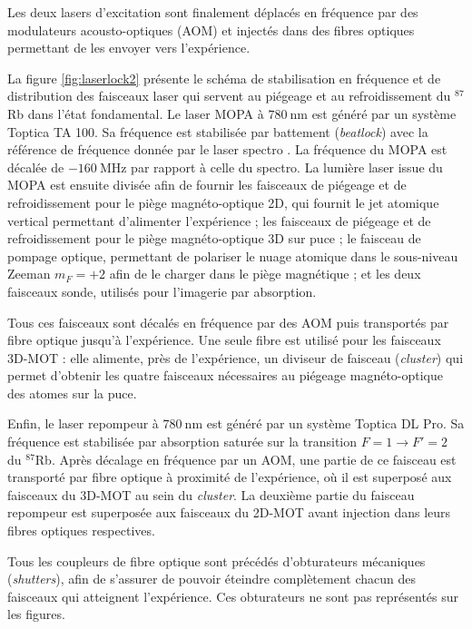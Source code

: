 \documentclass[11pt,a4paper,twoside]{book}
\newcommand{\Rb}[1]{${}^{#1}$Rb}
\begin{document}
Les deux lasers d'excitation sont finalement déplacés en fréquence par des modulateurs acousto-optiques (AOM) et injectés dans des fibres optiques permettant de les envoyer vers l'expérience.

La figure \eqref{fig:laserlock2} présente le schéma de stabilisation en fréquence et de distribution des faisceaux laser qui servent au piégeage et au refroidissement du \Rb{87} dans l'état fondamental.
Le laser \og MOPA \fg{} à $\SI{780}{\nano\meter}$ est généré par un système Toptica TA 100.
Sa fréquence est stabilisée par battement (\textit{beatlock}) avec la référence de fréquence donnée par le laser \og spectro \fg{}.
La fréquence du MOPA est décalée de $\SI{-160}{\MHz}$ par rapport à celle du spectro.
La lumière laser issue du MOPA est ensuite divisée afin de fournir les faisceaux de piégeage et de refroidissement pour le piège magnéto-optique 2D, qui fournit le jet atomique vertical permettant d'alimenter l'expérience ;
les faisceaux de piégeage et de refroidissement pour le piège magnéto-optique 3D sur puce ;
le faisceau de pompage optique, permettant de polariser le nuage atomique dans le sous-niveau Zeeman $m_F=+2$ afin de le charger dans le piège magnétique ;
et les deux faisceaux sonde, utilisés pour l'imagerie par absorption.

Tous ces faisceaux sont décalés en fréquence par des AOM puis transportés par fibre optique jusqu'à l'expérience.
Une seule fibre est utilisé pour les faisceaux \og 3D-MOT \fg{} : elle alimente, près de l'expérience, un diviseur de faisceau (\textit{cluster}) qui permet d'obtenir les quatre faisceaux nécessaires au piégeage magnéto-optique des atomes sur la puce.

Enfin, le laser \og repompeur \fg{} à $\SI{780}{\nano\meter}$ est généré par un système Toptica DL Pro.
Sa fréquence est stabilisée par absorption saturée sur la transition $F=1 \rightarrow F'=2$ du \Rb{87}.
Après décalage en fréquence par un AOM, une partie de ce faisceau est transporté par fibre optique à proximité de l'expérience, où il est superposé aux faisceaux du 3D-MOT au sein du \textit{cluster}.
La deuxième partie du faisceau repompeur est superposée aux faisceaux du 2D-MOT avant injection dans leurs fibres optiques respectives.

Tous les coupleurs de fibre optique sont précédés d'obturateurs mécaniques (\textit{shutters}), afin de s'assurer de pouvoir \og éteindre \fg{} complètement chacun des faisceaux qui atteignent l'expérience.
Ces obturateurs ne sont pas représentés sur les figures.
\end{document}
